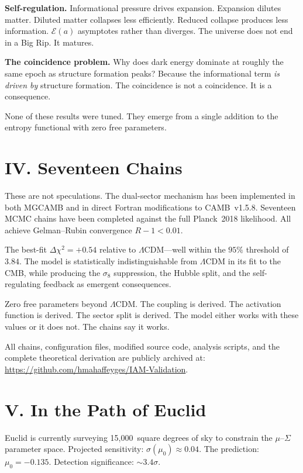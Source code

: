 \documentclass[12pt]{article}
\begin{document}
\textbf{Self-regulation.}  Informational pressure drives expansion.
Expansion dilutes matter.  Diluted matter collapses less efficiently.
Reduced collapse produces less information.  $\mathcal{E}(a)$ asymptotes
rather than diverges.  The universe does not end in a Big Rip.  It
matures.

\textbf{The coincidence problem.}  Why does dark energy dominate at roughly
the same epoch as structure formation peaks?  Because the informational
term \textit{is driven by} structure formation.  The coincidence is not a
coincidence.  It is a consequence.

None of these results were tuned.  They emerge from a single addition to
the entropy functional with zero free parameters.


\section*{IV. Seventeen Chains}

These are not speculations.  The dual-sector mechanism has been implemented
in both MGCAMB and in direct Fortran modifications to CAMB~v1.5.8.
Seventeen MCMC chains have been completed against the full Planck~2018
likelihood.  All achieve Gelman--Rubin convergence $R - 1 < 0.01$.

The best-fit $\Delta\chi^2 = +0.54$ relative to $\Lambda$CDM---well within
the $95\%$ threshold of $3.84$.  The model is statistically
indistinguishable from $\Lambda$CDM in its fit to the CMB, while producing
the $\sigma_8$ suppression, the Hubble split, and the self-regulating
feedback as emergent consequences.

Zero free parameters beyond $\Lambda$CDM.  The coupling is derived.  The
activation function is derived.  The sector split is derived.  The model
either works with these values or it does not.  The chains say it works.

All chains, configuration files, modified source code, analysis scripts,
and the complete theoretical derivation are publicly archived at:\\
\url{https://github.com/hmahaffeyges/IAM-Validation}.


\section*{V. In the Path of Euclid}

Euclid is currently surveying 15,000~square degrees of sky to constrain the
$\mu$--$\Sigma$ parameter space.  Projected sensitivity:
$\sigma(\mu_0) \approx 0.04$.  The prediction: $\mu_0 = -0.135$.
Detection significance: $\sim 3.4\sigma$.
\end{document}
